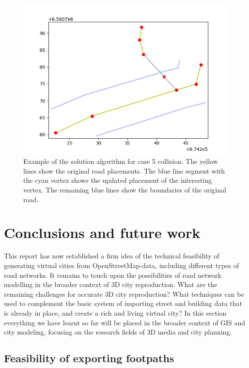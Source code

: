 \documentclass{kththesis}
\begin{document}
\begin{figure}[H]
    \centering
    \includegraphics[width=\textwidth,height=0.5\textheight,keepaspectratio]{img_feature_overlap_fix_4}
    \caption{Example of the solution algorithm for case 5 collision. The yellow lines show the original road placements. The blue line segment with the cyan vertex shows the updated placement of the interesting vertex. The remaining blue lines show the boundaries of the original road.}
    \label{fig:collision-case-5}
\end{figure}

\chapter{Conclusions and future work}

This report has now established a firm idea of the technical feasibility of generating virtual cities from OpenStreetMap-data, including different types of road networks.
It remains to touch upon the possibilities of road network modelling in the broader context of 3D city reproduction. What are the remaining challenges for accurate 3D city reproduction?
What techniques can be used to complement the basic system of importing street and building data that is already in place, and create a rich and living virtual city?
In this section everything we have learnt so far will be placed in the broader context of GIS and city modeling, focusing on the research fields of 3D media and city planning.

\section{Feasibility of exporting footpaths}
\end{document}

